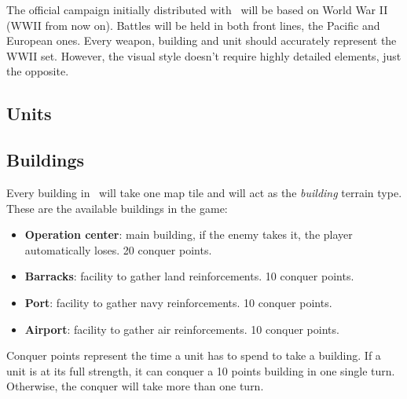The official campaign initially distributed with \game\ will be based on World
War II (WWII from now on). Battles will be held in both front lines, the Pacific
and European ones. Every weapon, building and unit should accurately represent
the WWII set. However, the visual style doesn't require highly detailed
elements, just the opposite.\\

\subsection{Units}








\subsection{Buildings}


Every building in \game\ will take one map tile and will act as the
\textit{building} terrain type. These are the available buildings in
the game:

\begin{itemize}
    \item \textbf{Operation center}: main building, if the enemy takes it, the
    player automatically loses. 20 conquer points.
    \item \textbf{Barracks}: facility to gather land reinforcements. 10 conquer
    points.
    \item \textbf{Port}: facility to gather navy reinforcements. 10 conquer
    points.
    \item \textbf{Airport}: facility to gather air reinforcements. 10 conquer
    points.
\end{itemize}

Conquer points represent the time a unit has to spend to take a building. If a
unit is at its full strength, it can conquer a 10 points building in one single
turn. Otherwise, the conquer will take more than one turn.\\

